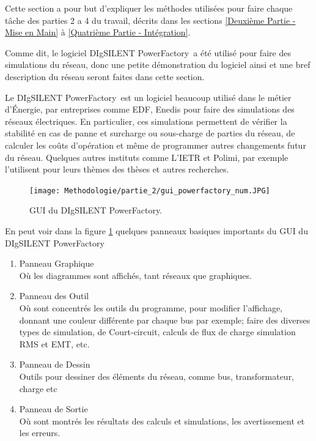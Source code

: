 Cette section a pour but d'expliquer les méthodes utilisées pour faire chaque tâche des parties 2 a 4 du travail, décrits dans les sections \ref{Deuxième Partie - Mise en Main} à \ref{Quatrième Partie - Intégration}.

\newcommand{\powerfactory}{DIgSILENT PowerFactory}
Comme dit, le logiciel \powerfactory\ a été utilisé pour faire des simulations du réseau, donc une petite démonstration du logiciel ainsi et une bref description du réseau seront faites dans cette section.

\mysubsubsection{À propos du \powerfactory}
Le \powerfactory\ est un logiciel beaucoup utilisé dans le métier d'Énergie, par entreprises comme \gls{EDF}, \gls{Enedis} pour faire des simulations des réseaux électriques. En particulier, ces simulations permettent de vérifier la stabilité en cas de panne et surcharge ou sous-charge de parties du réseau, de calculer les coûts d'opération et même de programmer autres changements futur du réseau. Quelques autres instituts comme L'\gls{IETR} et \gls{Polimi}, par exemple l'utilisent pour leurs thèmes des thèses et autres recherches.   

\begin{figure}[H]
	\begin{center}	
		\texttt{[image: Methodologie/partie\_2/gui\_powerfactory\_num.JPG]}
		\caption{\gls{GUI} du \powerfactory.}
		\label{fig:gui_powerfactory}
	\end{center}
\end{figure}

\pagebreak
En peut voir dans la figure \ref{fig:gui_powerfactory} quelques panneaux basiques importants du \gls{GUI} du \powerfactory

\begin{enumerate}[I]
	\item Panneau Graphique\\ Où les diagrammes sont affichés, tant réseaux que graphiques.
	\item Panneau des Outil\\ Où sont concentrés les outils du programme, pour modifier l'affichage, donnant une couleur différente par chaque bus par exemple; faire des diverses types de simulation,  de Court-circuit, calculs de flux de charge simulation \gls{RMS} et \gls{EMT}, etc.
	\item Panneau de Dessin\\ Outils pour dessiner des éléments du réseau, comme bus, transformateur, charge etc
	\item Panneau de Sortie\\ Où sont montrés les résultats des calculs et simulations, les avertissement et les erreurs.
\end{enumerate}


